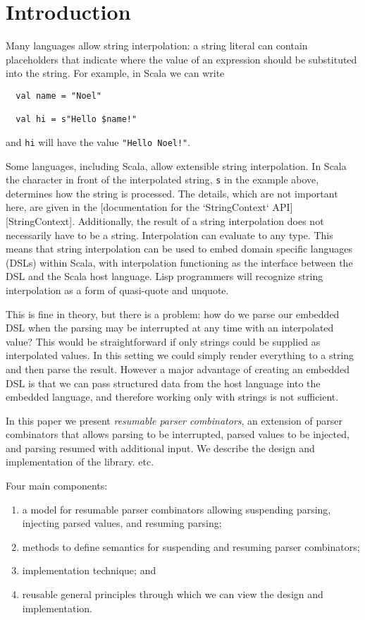 \section{Introduction}

Many languages allow string interpolation: a string literal can contain placeholders that indicate where the value of an expression should be substituted into the string. For example, in Scala we can write

\begin{lstlisting}
  val name = "Noel"

  val hi = s"Hello $name!"
\end{lstlisting}

and \lstinline{hi} will have the value \lstinline{"Hello Noel!"}.

Some languages, including Scala, allow extensible string interpolation. In Scala the character in front of the interpolated string, \texttt{s} in the example above, determines how the string is processed. The details, which are not important here, are given in the [documentation for the `StringContext` API][StringContext]. Additionally, the result of a string interpolation does not necessarily have to be a string. Interpolation can evaluate to any type. This means that string interpolation can be used to embed domain specific languages (DSLs) within Scala, with interpolation functioning as the interface between the DSL and the Scala host language. Lisp programmers will recognize string interpolation as a form of quasi-quote and unquote.

This is fine in theory, but there is a problem: how do we parse our embedded DSL when the parsing may be interrupted at any time with an interpolated value? This would be straightforward if only strings could be supplied as interpolated values. In this setting we could simply render everything to a string and then parse the result. However a major advantage of creating an embedded DSL is that we can pass structured data from the host language into the embedded language, and therefore working only with strings is not sufficient.

In this paper we present \emph{resumable parser combinators}, an extension of parser combinators that allows parsing to be interrupted, parsed values to be injected, and parsing resumed with additional input. We describe the design and implementation of the library. etc.

Four main components:

\begin{enumerate}
  \item a model for resumable parser combinators allowing suspending parsing, injecting parsed values, and resuming parsing;
  \item methods to define semantics for suspending and resuming parser combinators;
  \item implementation technique; and
  \item reusable general principles through which we can view the design and implementation.
\end{enumerate}
